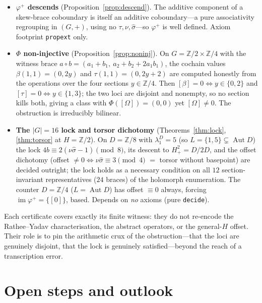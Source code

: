 \documentclass[11pt,reqno]{amsart}
\theoremstyle{plain}
\theoremstyle{definition}
\newcommand{\Z}{\mathbb{Z}}
\newcommand{\im}{\operatorname{im}}
\newcommand{\Aut}{\operatorname{Aut}}
\newcommand{\shat}{\widehat{\sigma}}
\newcommand{\lD}{\lambda^{D}}
\begin{document}
\begin{itemize}\itemsep3pt
\item\textbf{$\varphi^{+}$ descends} (Proposition~\ref{prop:descend}). The additive
component of a skew-brace coboundary is itself an additive coboundary---a pure associativity
regrouping in $(G,+)$, using no $\tau,\nu,\shat$---so $\varphi^{+}$ is well defined. Axiom
footprint \texttt{propext} only.

\item\textbf{$\Phi$ non-injective} (Proposition~\ref{prop:noninj}). On $G=\Z/2\times\Z/4$
with the witness brace $a\circ b=(a_1+b_1,\ a_2+b_2+2a_1b_1)$, the cochain values
$\beta(1,1)=(0,2y)$ and $\tau(1,1)=(0,2y+2)$ are computed honestly from the operations over
the four sections $y\in\Z/4$. Then $[\beta]=0\iff y\in\{0,2\}$ and $[\tau]=0\iff y\in\{1,3\}$;
the two loci are disjoint and nonempty, so no section kills both, giving a class with
$\Phi([\Omega])=(0,0)$ yet $[\Omega]\ne0$. The obstruction is irreducibly bilinear.

\item\textbf{The $|G|=16$ lock and torsor dichotomy} (Theorems~\ref{thm:lock},
\ref{thm:torsor} at $H=\Z/2$). On $D=\Z/8$ with $\lD_1=5$ (so $L=\{1,5\}\subsetneq\Aut D$)
the lock $4b\equiv2(\nu\shat-1)\pmod8$, its descent to $H^2_+=D/2D$, and the offset
dichotomy (offset $\ne0\iff\nu\shat\equiv3\pmod4$ $=$ torsor without basepoint) are decided
outright; the lock holds as a necessary condition on all $12$ section-invariant
representatives ($24$ braces) of the holomorph enumeration. The counter $D=\Z/4$
($L=\Aut D$) has offset $\equiv0$ always, forcing $\im\varphi^{+}=\{[0]\}$, based. Depends
on \emph{no} axioms (pure \texttt{decide}).
\end{itemize}

Each certificate covers exactly its finite witness: they do not re-encode the
Rathee--Yadav characterisation, the abstract operators, or the general-$H$ offset. Their
role is to pin the arithmetic crux of the obstruction---that the loci are genuinely disjoint,
that the lock is genuinely satisfied---beyond the reach of a transcription error.

\section{Open steps and outlook}\label{sec:open}
\end{document}
